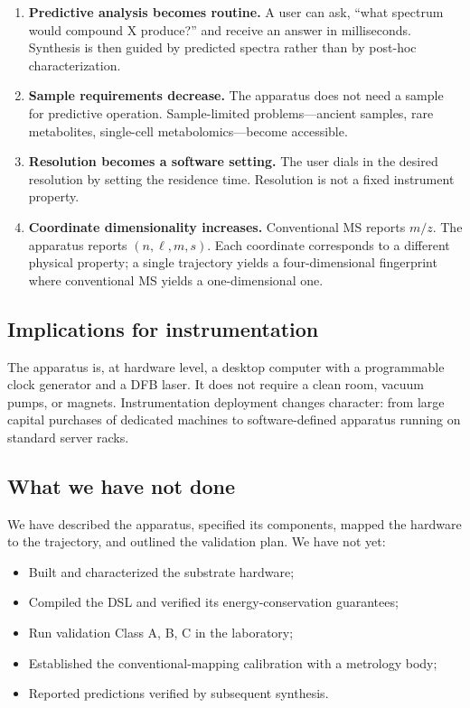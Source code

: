 \documentclass[twocolumn,11pt,a4paper]{article}
\theoremstyle{definition}
\theoremstyle{remark}
\begin{document}
\begin{enumerate}[nosep]
    \item \textbf{Predictive analysis becomes routine.} A user can ask, ``what spectrum would compound X produce?'' and receive an answer in milliseconds. Synthesis is then guided by predicted spectra rather than by post-hoc characterization.
    \item \textbf{Sample requirements decrease.} The apparatus does not need a sample for predictive operation. Sample-limited problems---ancient samples, rare metabolites, single-cell metabolomics---become accessible.
    \item \textbf{Resolution becomes a software setting.} The user dials in the desired resolution by setting the residence time. Resolution is not a fixed instrument property.
    \item \textbf{Coordinate dimensionality increases.} Conventional MS reports $m/z$. The apparatus reports $(n, \ell, m, s)$. Each coordinate corresponds to a different physical property; a single trajectory yields a four-dimensional fingerprint where conventional MS yields a one-dimensional one.
\end{enumerate}

\subsection{Implications for instrumentation}

The apparatus is, at hardware level, a desktop computer with a programmable clock generator and a DFB laser. It does not require a clean room, vacuum pumps, or magnets. Instrumentation deployment changes character: from large capital purchases of dedicated machines to software-defined apparatus running on standard server racks.

\subsection{What we have not done}

We have described the apparatus, specified its components, mapped the hardware to the trajectory, and outlined the validation plan. We have not yet:

\begin{itemize}[nosep]
    \item Built and characterized the substrate hardware;
    \item Compiled the DSL and verified its energy-conservation guarantees;
    \item Run validation Class A, B, C in the laboratory;
    \item Established the conventional-mapping calibration with a metrology body;
    \item Reported predictions verified by subsequent synthesis.
\end{itemize}
\end{document}
